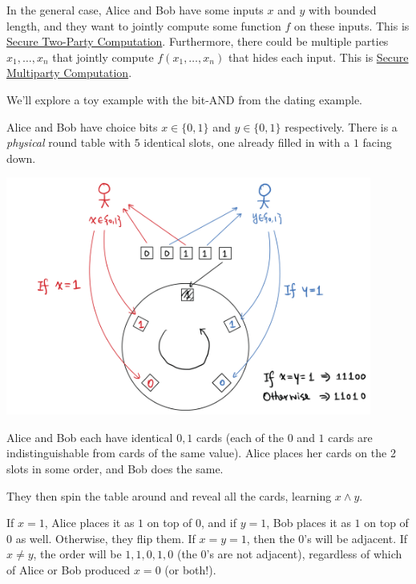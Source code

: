 In the general case, Alice and Bob have some inputs $x$ and $y$ with bounded length, and they want to jointly compute some function $f$ on these inputs. This is \ul{Secure Two-Party Computation}. Furthermore, there could be multiple parties $x_1, \dots, x_n$ that jointly compute $f(x_1, \dots, x_n)$ that hides each input. This is \ul{Secure Multiparty Computation}.

We'll explore a toy example with the bit-\textsf{AND} from the dating example.

\begin{example*}
    Alice and Bob have choice bits $x\in\{0, 1\}$ and $y\in\{0, 1\}$ respectively. There is a \emph{physical} round table with $5$ identical slots, one already filled in with a $1$ facing down.

    \begin{center}
        \includegraphics[width=0.9\textwidth]{images/2023-01-26/private_dating.png}
    \end{center}

    Alice and Bob each have identical $0, 1$ cards (each of the $0$ and $1$ cards are indistinguishable from cards of the same value). Alice places her cards on the 2 slots in some order, and Bob does the same.

    They then spin the table around and reveal all the cards, learning $x\land y$.

    If $x = 1$, Alice places it as $1$ on top of $0$, and if $y = 1$, Bob places it as $1$ on top of $0$ as well. Otherwise, they flip them. If $x = y = 1$, then the $0$'s will be adjacent. If $x \neq y$, the order will be $1,1,0,1,0$ (the $0$'s are not adjacent), regardless of which of Alice or Bob produced $x = 0$ (or both!).
\end{example*}

